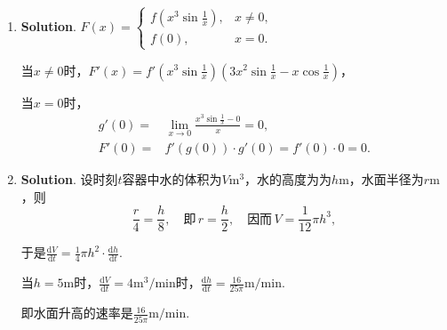 \documentclass[../Main.tex]{subfiles}
\begin{document}
\begin{enumerate}
    \item \textbf{Solution}. $F(x)=
              \begin{cases}
                  f\left(x^{3}\sin\frac{1}{x}\right), & x\neq0, \\
                  f(0),                               & x=0.
              \end{cases}$

          当$x\neq0$时，$F'(x)=f'\left(x^{3}\sin\frac{1}{x}\right)\left(3x^{2}\sin\frac{1}{x}
              -x\cos\frac{1}{x}\right)$，

          当$x=0$时，
          \[
              \begin{aligned}
                  g'(0)=  & \lim_{x\to0}\frac{x^3\sin\frac{1}{x}-0}{x}=0, \\
                  F'(0) = & f'\left(g(0)\right)\cdot g'(0)=f'(0)\cdot0=0.
              \end{aligned}
          \]

    \item \textbf{Solution}. 设时刻$t$容器中水的体积为$V\mathrm{m}^{3}$，水的高度为为$h
              \mathrm{m}$，水面半径为$r\mathrm{m}$，则
          \[
              \frac{r}{4}=\frac{h}{8},\quad\text{即}\,r=\frac{h}{2},\quad\text{因而}\,V
              =\frac{1}{12}\pi h^{3},
          \]

          于是$\frac{\mathrm{d}V}{\mathrm{d}t}=\frac{1}{4}\pi h^{2}\cdot\frac{\mathrm{d}h}{\mathrm{d}t}$.

          当$h=5\mathrm{m}$时，$\frac{\mathrm{d}V}{\mathrm{d}t}=4\mathrm{m}^{3}/\mathrm{min}$时，$\frac{\mathrm{d}h}{\mathrm{d}t}
              =\frac{16}{25\pi}\mathrm{m}/\mathrm{min}$.

          即水面升高的速率是$\frac{16}{25\pi}\mathrm{m}/\mathrm{min}$.
\end{enumerate}
\end{document}
